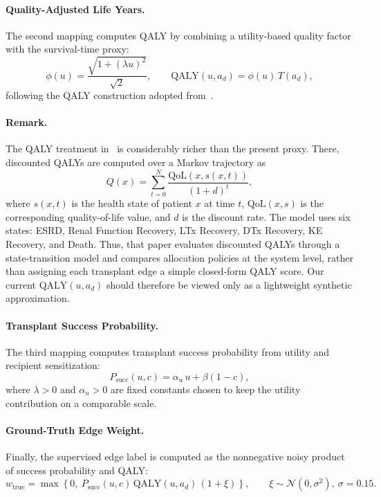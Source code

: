 \documentclass{article}
\begin{document}
\paragraph{Quality-Adjusted Life Years.}
The second mapping computes QALY by combining a utility-based quality factor with the survival-time proxy:
\[
\phi(u)=\frac{\sqrt{1+(\lambda u)^{2}}}{\sqrt 2},\qquad
\mathrm{QALY}(u,a_d)=\phi(u)\,T(a_d),
\]
following the QALY construction adopted from~\citep{prieto2003qaly}.
\paragraph{Remark.}
The QALY treatment in~\citet{glorie2022health} is considerably richer than the present proxy. There, discounted QALYs are computed over a Markov trajectory as
\[
Q(x)=\sum_{t=0}^{N}\frac{\mathrm{QoL}(x,s(x,t))}{(1+d)^t},
\]
where \(s(x,t)\) is the health state of patient \(x\) at time \(t\), \(\mathrm{QoL}(x,s)\) is the corresponding quality-of-life value, and \(d\) is the discount rate. The model uses six states: ESRD, Renal Function Recovery, LTx Recovery, DTx Recovery, KE Recovery, and Death. Thus, that paper evaluates discounted QALYs through a state-transition model and compares allocation policies at the system level, rather than assigning each transplant edge a simple closed-form QALY score. Our current \(\mathrm{QALY}(u,a_d)\) should therefore be viewed only as a lightweight synthetic approximation.
\paragraph{Transplant Success Probability.}
The third mapping computes transplant success probability from utility and recipient sensitization:
\[
P_{\mathrm{succ}}(u,c)=\alpha_u\,u+\beta(1-c),
\]
where $\lambda>0$ and $\alpha_u>0$ are fixed constants chosen to keep the utility contribution on a comparable scale.
\paragraph{Ground-Truth Edge Weight.}
Finally, the supervised edge label is computed as the nonnegative noisy product of success probability and QALY:
\[
w_{\text{true}}
=\max\!\left\{0,\ P_{\mathrm{succ}}(u,c)\,\mathrm{QALY}(u,a_d)\,(1+\xi)\right\},
\qquad
\xi\sim\mathcal{N}(0,\sigma^2),\ \sigma=0.15.
\]
\end{document}
